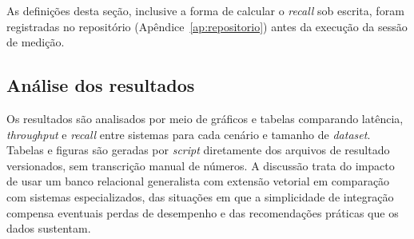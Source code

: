 As definições desta seção, inclusive a forma de calcular o \textit{recall} sob escrita, foram registradas no repositório (Apêndice~\ref{ap:repositorio}) antes da execução da sessão de medição.

\subsection{Análise dos resultados}

Os resultados são analisados por meio de gráficos e tabelas comparando latência, \textit{throughput} e \textit{recall} entre sistemas para cada cenário e tamanho de \textit{dataset}. Tabelas e figuras são geradas por \textit{script} diretamente dos arquivos de resultado versionados, sem transcrição manual de números. A discussão trata do impacto de usar um banco relacional generalista com extensão vetorial em comparação com sistemas especializados, das situações em que a simplicidade de integração compensa eventuais perdas de desempenho e das recomendações práticas que os dados sustentam.
